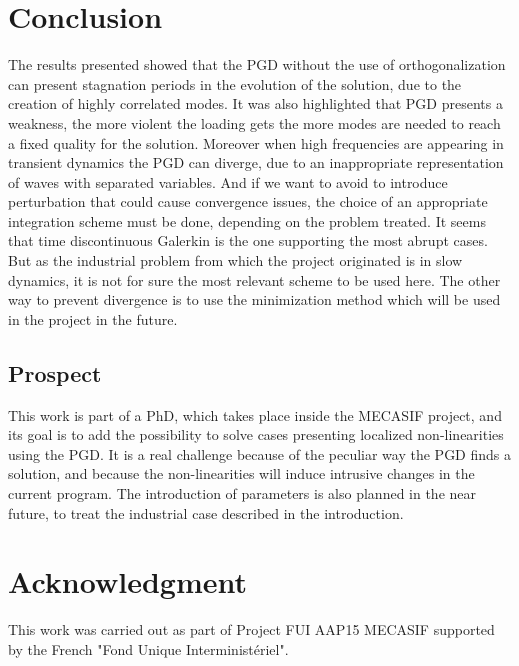 \documentclass[12pt,a4paper]{article}
\begin{document}
\section{Conclusion}
The results presented showed that the PGD without the use of orthogonalization can present stagnation periods in the evolution of the solution, due to the creation of highly correlated modes. It was also highlighted that PGD presents a weakness, the more violent the loading gets the more modes are needed to reach a fixed quality for the solution. Moreover when high frequencies are appearing in transient dynamics the PGD can diverge, due to an inappropriate representation of waves with separated variables. And if we want to avoid to introduce perturbation that could cause convergence issues, the choice of an appropriate integration scheme must be done, depending on the problem treated. It seems that time discontinuous Galerkin is the one supporting the most abrupt cases. But as the industrial problem from which the project originated is in slow dynamics, it is not for sure the most relevant scheme to be used here. The other way to prevent divergence is to use the minimization method which will be used in the project in the future.

\subsection{Prospect}
This work is part of a PhD, which takes place inside the MECASIF project, and its goal is to add the possibility to solve cases presenting localized non-linearities using the PGD. It is a real challenge because of the peculiar way the PGD finds a solution, and because the non-linearities will induce intrusive changes in the current program. The introduction of parameters is also planned in the near future, to treat the industrial case described in the introduction. 

%
%
%

\section*{Acknowledgment}
This work was carried out as part of Project FUI AAP15 MECASIF  supported by the French "Fond Unique Interministériel".

%


\end{document}
